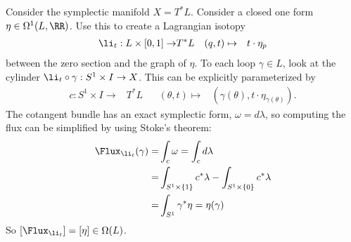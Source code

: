 

    Consider the symplectic manifold $X=T^*L$.
    Consider a closed one form  $\eta \in \Omega^1(L, \RR)$.
    Use this to create a Lagrangian isotopy 
    \begin{align*}
        \li_t: L\times [0, 1]\to& T^*L &&       (q,t) \mapsto& t\cdot \eta_p
    \end{align*}
    between the zero section and the graph of $\eta$. 
    To each loop $\gamma\in L$, look at the cylinder $\li_t\circ \gamma:S^1\times I\to X$.
    This can be explicitly parameterized by 
    \begin{align*}
        c: S^1\times I \to& T^*L&&
        (\theta, t) \mapsto& (\gamma(\theta), t\cdot \eta_{\gamma(\theta)}).
    \end{align*}
    The cotangent bundle has an exact symplectic form, $\omega=d\lambda$, so computing the flux can be simplified by using Stoke's theorem:
    \begin{align*}
        \Flux_{\li_t}(\gamma)=&\int_{c}\omega=\int_{c}d\lambda \\
        =&\int_{S^1\times \{1\}}c^*\lambda - \int_{S^1\times\{0\}}c^*\lambda \\
        =&\int_{S^1}\gamma^*\eta=\eta(\gamma)
    \end{align*}
    So $[\Flux_{\li_t}]=[\eta]\in \Omega(L)$. 

